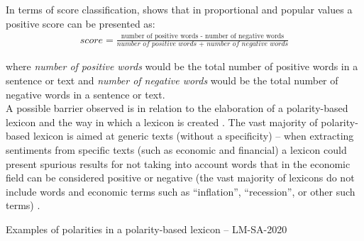 In terms of score classification, \cite{BCDG07} shows that in proportional and popular values a positive score can be presented as:
\begin{align*}
score = \frac{\text{number of positive words - number of negative words}}{\textit{number of positive words + number of negative words}}
\end{align*}

where \textit{number of positive words} would be the total number of positive words in a sentence or text and \textit{number of negative words} would be the total number of negative words in a sentence or text.\\

A possible barrier observed is in relation to the elaboration of a polarity-based lexicon and the way in which a lexicon is created \cite[]{stone1966general}. The vast majority of polarity-based lexicon is aimed at generic texts (without a specificity) -- when extracting sentiments from specific texts (such as economic and financial) a lexicon could present spurious results for not taking into account words that in the economic field can be considered positive or negative (the vast majority of lexicons do not include words and economic terms such as ``inflation'', ``recession'', or other such terms) \cite[]{loughran2011liability}.\\

\begin{table}[!h]
\caption{Examples of polarities in a polarity-based lexicon -- LM-SA-2020}
\caption*{Source: Words and polarities taken from \cite[]{lmdata}}
\label{tab:polarity}
\end{table}

